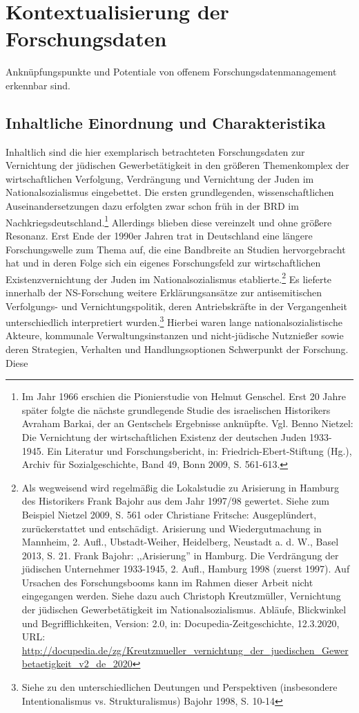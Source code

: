 \onehalfspacing

\section{Kontextualisierung der Forschungsdaten}

Anknüpfungspunkte und Potentiale von offenem Forschungsdatenmanagement erkennbar sind.


\subsection{Inhaltliche Einordnung und Charakteristika} 

Inhaltlich sind die hier exemplarisch betrachteten Forschungsdaten zur Vernichtung der jüdischen Gewerbetätigkeit in den größeren Themenkomplex der wirtschaftlichen Verfolgung, Verdrängung und Vernichtung der Juden im Nationalsozialismus eingebettet. Die ersten grundlegenden, wissenschaftlichen Auseinandersetzungen dazu erfolgten zwar schon früh in der BRD im Nachkriegsdeutschland.\footnote{Im Jahr 1966 erschien die Pionierstudie von Helmut Genschel. Erst 20 Jahre später folgte die nächste grundlegende Studie des israelischen Historikers Avraham Barkai, der an Gentschels Ergebnisse anknüpfte. Vgl. Benno Nietzel: Die Vernichtung der wirtschaftlichen Existenz der deutschen Juden 1933-1945. Ein Literatur und Forschungsbericht, in: Friedrich-Ebert-Stiftung (Hg.), Archiv für Sozialgeschichte, Band 49, Bonn 2009, S. 561-613.} Allerdings blieben diese vereinzelt und ohne größere Resonanz. Erst Ende der 1990er Jahren trat in Deutschland eine längere Forschungswelle zum Thema auf, die eine Bandbreite an Studien hervorgebracht hat und in deren Folge sich ein eigenes Forschungsfeld zur wirtschaftlichen Existenzvernichtung der Juden im Nationalsozialismus etablierte.\footnote{Als wegweisend wird regelmäßig die Lokalstudie zu Arisierung in Hamburg des Historikers Frank Bajohr aus dem Jahr 1997/98 gewertet. Siehe zum Beispiel Nietzel 2009, S. 561 oder Christiane Fritsche: Ausgeplündert, zurückerstattet und entschädigt. Arisierung und Wiedergutmachung in Mannheim, 2. Aufl., Ubstadt-Weiher, Heidelberg, Neustadt a. d. W., Basel 2013, S. 21. Frank Bajohr: ,,Arisierung'' in Hamburg. Die Verdrängung der jüdischen Unternehmer 1933-1945, 2. Aufl., Hamburg 1998 (zuerst 1997). Auf Ursachen des Forschungsbooms kann im Rahmen dieser Arbeit nicht eingegangen werden. Siehe dazu auch Christoph Kreutzmüller, Vernichtung der jüdischen Gewerbetätigkeit im Nationalsozialismus. Abläufe, Blickwinkel und Begrifflichkeiten, Version: 2.0, in: Docupedia-Zeitgeschichte, 12.3.2020, URL: \url{http://docupedia.de/zg/Kreutzmueller_vernichtung_der_juedischen_Gewerbetaetigkeit_v2_de_2020}} Es lieferte innerhalb der NS-Forschung weitere Erklärungsansätze zur antisemitischen Verfolgungs- und Vernichtungspolitik, deren Antriebskräfte in der Vergangenheit unterschiedlich interpretiert wurden.\footnote{Siehe zu den unterschiedlichen Deutungen und Perspektiven (insbesondere Intentionalismus vs. Strukturalismus) Bajohr 1998, S. 10-14} Hierbei waren lange nationalsozialistische Akteure, kommunale Verwaltungsinstanzen und nicht-jüdische Nutznießer sowie deren Strategien, Verhalten und Handlungsoptionen Schwerpunkt der Forschung. Diese 